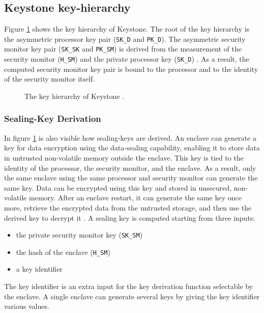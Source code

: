 \subsection{Keystone key-hierarchy}
Figure \ref{keystone-key-hierarchy} shows the key hierarchy of Keystone. The root of the key hierarchy is the asymmetric processor key pair (\texttt{SK\_D} and  \texttt{PK\_D}). The asymmetric security monitor key pair (\texttt{SK\_SK} and \texttt{PK\_SM}) is derived from the measurement of the security monitor (\texttt{H\_SM}) and the private processor key (\texttt{SK\_D}) \cite{keystone-doc}.
As a result, the computed security monitor key pair is bound to the processor and to the identity of the security monitor itself.

\begin{figure}[h!]
    \centering
    
    \caption{The key hierarchy of Keystone \cite{keystone-doc}.}
    \label{keystone-key-hierarchy}
\end{figure}
\subsubsection{Sealing-Key Derivation}
In figure \ref{keystone-key-hierarchy} is also visible how sealing-keys are derived. An enclave can generate a key for data encryption using the data-sealing capability, enabling it to store data in untrusted non-volatile memory outside the enclave. This key is tied to the identity of the processor, the security monitor, and the enclave. As a result, only the same enclave using the same processor and security monitor can generate the same key. Data can be encrypted using this key and stored in unsecured, non-volatile memory. After an enclave restart, it can generate the same key once more, retrieve the encrypted data from the untrusted storage, and then use the derived key to decrypt it \cite{keystone-doc}.
A sealing key is computed starting from three inputs:
\begin{itemize}
    \item the private security monitor key (\texttt{SK\_SM})
    \item the hash of the enclave (\texttt{H\_SM})
    \item a key identifier
\end{itemize}
The key identifier is an extra input for the key derivation function selectable by the enclave. A single enclave can generate several keys by giving the key identifier various values.


